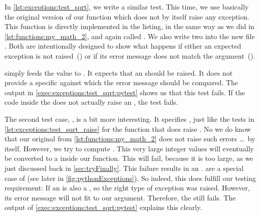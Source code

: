 %
In \cref{lst:exceptions:test_sqrt}, we write a similar test.
This time, we use basically the original version of our  function which does not by itself raise any exception.
This function is directly implemented in the listing, in the same way as we did in \cref{lst:functions:my_math_2}, and again called .
We also write two  into the new file .
Both are intentionally designed to show what happens if either an expected exception is not raised~() or if its error message does not match the  argument~().%
%
\begin{sloppypar}%
 simply feeds the value  to .
It expects that an  should be raised.
It does not provide a specific   against which the error message should be compared.
The output in \cref{exec:exceptions:test_sqrt:pytest} shows us that this test fails.
If the code inside the  does not actually raise an , the test fails.%
\end{sloppypar}%
%
\begin{sloppypar}%
The second test case, , is a bit more interesting.
It specifies , just like the tests in \cref{lst:exceptions:test_sqrt_raise} for the  function that does raise .
No we do know that our original  from \cref{lst:functions:my_math_2} does not raise such errors \dots\ by itself.
However, we try to compute .
This very large integer values will eventually be converted to a  inside our function.
This will fail, because it is too large, as we just discussed back in \cref{sec:tryFinally}.
This failure results in an .
 are a special case of  (see later in \cref{fig:pythonExceptions}).
So indeed, this does fulfill our testing requirement:
If an  is also a , so the right type of exception was raised.
However, its error message will not fit to our  argument.
Therefore, the  still fails.
The output of \cref{exec:exceptions:test_sqrt:pytest} explains this clearly.%
\end{sloppypar}%
